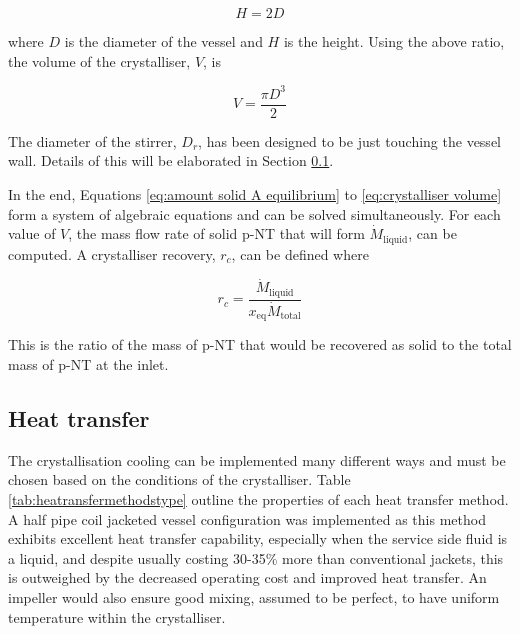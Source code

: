 \begin{equation}
    H = 2D
\end{equation}

\noindent where $D$ is the diameter of the vessel and $H$ is the height. Using the above ratio, the volume of the crystalliser, $V$, is

\begin{equation} \label{eq:crystalliser volume}
    V = \frac{\pi D^3}{2} 
\end{equation}

\noindent The diameter of the stirrer, $D_r$, has been designed to be just touching the vessel wall. Details of this will be elaborated in Section \ref{sec:heat transfer crystalliser}.

In the end, Equations \ref{eq:amount solid A equilibrium} to \ref{eq:crystalliser volume} form a system of algebraic equations and can be solved simultaneously. For each value of $V$, the mass flow rate of solid p-NT that will form $\dot{M}_{\mathrm{liquid}}$, can be computed. A crystalliser recovery, $r_c$, can be defined where

\begin{equation}
    r_c = \frac{\dot{M}_{\mathrm{liquid}}}{x_{\mathrm{eq}} \dot{M}_{\mathrm{total}}}
\end{equation}

\noindent This is the ratio of the mass of p-NT that would be recovered as solid to the total mass of p-NT at the inlet.

\subsection{Heat transfer}\label{sec:heat transfer crystalliser}

The crystallisation cooling can be implemented many different ways and must be chosen based on the conditions of the crystalliser. Table \ref{tab:heatransfermethodstype} outline the properties of each heat transfer method. A half pipe coil jacketed vessel configuration was implemented as this method exhibits excellent heat transfer capability, especially when the service side fluid is a liquid, and despite usually costing 30-35\% more than conventional jackets, this is outweighed by the decreased operating cost and improved heat transfer. An impeller would also ensure good mixing, assumed to be perfect, to have uniform temperature within the crystalliser. 

